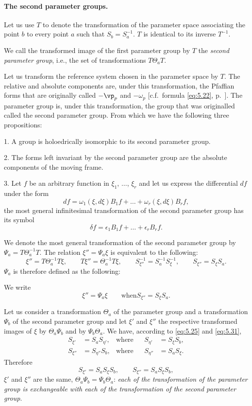 \paragraph{The second parameter groups.}
\label{sec:82}
{\small Let us use $T$ to denote the transformation of the parameter space associating the point $b$ to every point $a$ such that $S_{b}=S_{a}^{-1}$. $T$ is identical to its inverse $T^{-1}$.

We call the transformed image of the first parameter group by $T$ the \emph{second parameter group}, i.e., the set of transformations $T\Theta_{a}T$.

Let us transform the reference system chosen in the parameter space by $T$. The relative and absolute components are, under this transformation, the Pfaffian forms that are originally called $-\vp_{p}$ and $-\omega_{p}$ [c.f.~formula \eqref{eq:5.22}, p.~\pageref{eq:5.22}]. The parameter group is, under this transformation, the group that was originalled called the second parameter group. From which we have the following three propositions:

1. A group is holoedrically isomorphic to its second parameter group.

2. The forms left invariant by the second parameter group are the absolute components of the moving frame.

3. Let $f$ be an arbitrary function in $\xi_{1}$, $\dots$, $\xi_{r}$ and let us express the differential $df$ under the form
\[
df=\omega_{1}(\xi,d\xi)B_{1}f+\dots+\omega_{r}(\xi,d\xi)B_{r}f,
\]
the most general infinitesimal transformation of the second parameter group has its symbol
\[
\delta f=\epsilon_{1}B_{1}f+\dots+\epsilon_{r}B_{r}f.
\]

We denote the most general transformation of the second parameter group by $\Psi_{a}=T\Theta_{a}^{-1}T$. The relation $\xi''=\Psi_{a}\xi$ is equivalent to the following:
\[
\xi''=T\Theta_{a}^{-1}T\xi,\qquad T\xi''=\Theta_{a}^{-1}T\xi,\qquad S_{\xi''}^{-1}=S_{a}^{-1}S_{\xi}^{-1},\qquad S_{\xi''}=S_{\xi}S_{a}.
\]
$\Psi_{a}$ is therefore defined as the following:

We write
\begin{equation}
  \label{eq:5.31}
  \xi''=\Psi_{a}\xi\qquad\text{when} S_{\xi''}=S_{\xi}S_{a}.
\end{equation}

Let us consider a transformation $\Theta_{a}$ of the parameter group and a transformation $\Psi_{b}$ of the second parameter group and let $\xi'$ and $\xi''$ the respective transformed images of $\xi$ by $\Theta_{a}\Psi_{b}$ and by $\Psi_{b}\Theta_{a}$. We have, according to \eqref{eq:5.25} and \eqref{eq:5.31},
\[
\begin{aligned}
  S_{\xi'}&=S_{a}S_{\eta'},&\text{where}&&S_{\eta'}&=S_{\xi}S_{b},\\
  S_{\xi''}&=S_{\eta''}S_{b},&\text{where}&&S_{\eta''}&=S_{a}S_{\xi}.
\end{aligned}
\]
Therefore
\[
S_{\xi'}=S_{a}S_{\xi}S_{b},\qquad S_{\xi''}=S_{a}S_{\xi}S_{b},
\]
$\xi'$ and $\xi''$ are the same, $\Theta_{a}\Psi_{b}=\Psi_{b}\Theta_{a}$: \emph{each of the transformation of the parameter group is exchangeable with each of the transformation of the second parameter group}.
}



